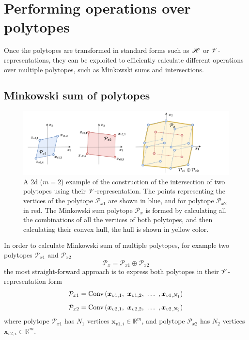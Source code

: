 
\chapter{Performing operations over polytopes}
\label{ch:operations_over_poly_stategies}

Once the polytopes are transformed in standard forms such as $\mathscr{H}$ or $\mathscr{V}$-representations, they can be exploited to efficiently calculate different operations over multiple polytopes, such as Minkowski sums  and intersections.

\section{Minkowski sum of polytopes}
\begin{figure}[!h]
    \centering
    \includegraphics[width=0.9\linewidth]{Chapters/imgs/polytope_minkowski_sum.pdf}
    \caption{A 2d ($m\!=\!2$) example of the construction of the intersection of two polytopes using their $\mathscr{V}$-representation. The points representing the vertices of the polytope $\mathcal{P}_{x1}$ are shown in blue, and for polytope $\mathcal{P}_{x2}$ in red. The Minkowski sum polytope $\mathcal{P}_x$ is formed by calculating all the combinations of all the vertices of both polytopes, and then calculating their convex hull, the hull is shown in yellow color.}
    \label{fig:collab_sum_solution}
\end{figure}

In order to calculate Minkowski sum of multiple polytopes, for example two polytopes $\mathcal{P}_{x1}$ and $ \mathcal{P}_{x2}$
\begin{equation}
    \mathcal{P}_x = \mathcal{P}_{x1} \oplus \mathcal{P}_{x2}
\end{equation}
the most straight-forward approach is to express both polytopes in their $\mathscr{V}$-representation form
\begin{equation}
    \mathcal{P}_{x1} = \text{Conv}\left(\bm{x}_{v1,1},~\bm{x}_{v1,2},~\ldots~,\bm{x}_{v1,N_1}\right)
\end{equation}
\begin{equation}
    \mathcal{P}_{x2} =  \text{Conv}\left(\bm{x}_{v2,1},~\bm{x}_{v2, 2},~\ldots~,\bm{x}_{v2,N_2}\right)
\end{equation}
where polytope $\mathcal{P}_{x1}$ has $N_1$ vertices $\bm{x}_{v1,i}\in \mathbb{R}^m$, and polytope $\mathcal{P}_{x2}$ has $N_2$ vertices $\bm{x}_{v2,i}\in \mathbb{R}^m$.

